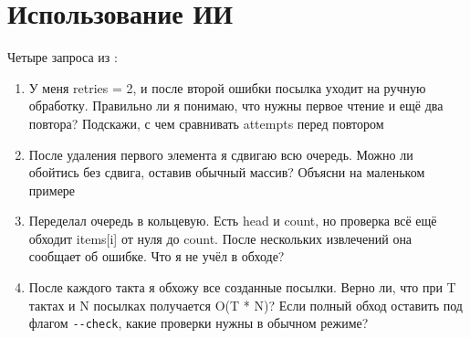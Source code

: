 \section{Использование ИИ}
Четыре запроса из :
\begin{enumerate}[leftmargin=*,itemsep=0.6em,topsep=0.4em]
\item У меня retries = 2, и после второй ошибки посылка уходит на ручную обработку. Правильно ли я понимаю, что нужны первое чтение и ещё два повтора? Подскажи, с чем сравнивать attempts перед повтором
\item После удаления первого элемента я сдвигаю всю очередь. Можно ли обойтись без сдвига, оставив обычный массив? Объясни на маленьком примере
\item Переделал очередь в кольцевую. Есть head и count, но проверка всё ещё обходит items[i] от нуля до count. После нескольких извлечений она сообщает об ошибке. Что я не учёл в обходе?
\item После каждого такта я обхожу все созданные посылки. Верно ли, что при T тактах и N посылках получается O(T * N)? Если полный обход оставить под флагом \texttt{-{}-check}, какие проверки нужны в обычном режиме?
\end{enumerate}
